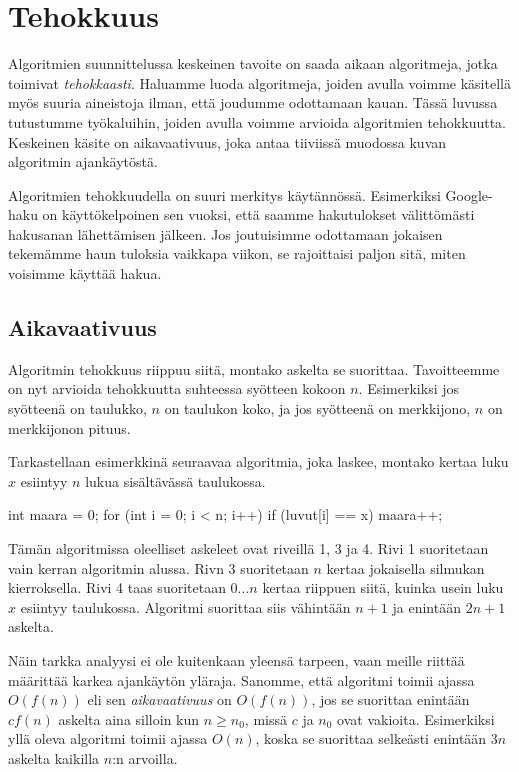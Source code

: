 \chapter{Tehokkuus}

Algoritmien suunnittelussa keskeinen tavoite on saada aikaan
algoritmeja, jotka toimivat \emph{tehokkaasti}.
Haluamme luoda algoritmeja, joiden avulla voimme
käsitellä myös suuria aineistoja ilman, että joudumme
odottamaan kauan.
Tässä luvussa tutustumme työkaluihin, joiden avulla
voimme arvioida algoritmien tehokkuutta.
Keskeinen käsite on aikavaativuus, joka antaa
tiiviissä muodossa kuvan algoritmin ajankäytöstä.

Algoritmien tehokkuudella on suuri merkitys käytännössä.
Esimerkiksi Google-haku on käyttökelpoinen sen vuoksi,
että saamme hakutulokset välittömästi hakusanan lähettämisen
jälkeen.
Jos joutuisimme odottamaan jokaisen tekemämme haun
tuloksia vaikkapa viikon,
se rajoittaisi paljon sitä, miten voisimme käyttää hakua.


\section{Aikavaativuus}

Algoritmin tehokkuus riippuu siitä,
montako askelta se suorittaa.
Tavoitteemme on nyt arvioida tehokkuutta suhteessa
syötteen kokoon $n$.
Esimerkiksi jos syötteenä on taulukko,
$n$ on taulukon koko,
ja jos syötteenä on merkkijono,
$n$ on merkkijonon pituus.

Tarkastellaan esimerkkinä seuraavaa algoritmia,
joka laskee, montako kertaa luku $x$ esiintyy
$n$ lukua sisältävässä taulukossa.

\begin{code}[numbers=left]
int maara = 0;
for (int i = 0; i < n; i++) {
    if (luvut[i] == x) {
        maara++;
    }
}
\end{code}

Tämän algoritmissa oleelliset askeleet ovat riveillä
1, 3 ja 4.
Rivi 1 suoritetaan vain kerran algoritmin alussa.
Rivn 3 suoritetaan $n$ kertaa jokaisella silmukan
kierroksella.
Rivi 4 taas suoritetaan $0 \dots n$
kertaa riippuen siitä, kuinka usein
luku $x$ esiintyy taulukossa.
Algoritmi suorittaa siis vähintään $n+1$ ja enintään $2n+1$
askelta.

Näin tarkka analyysi ei ole kuitenkaan yleensä tarpeen,
vaan meille riittää määrittää karkea ajankäytön yläraja.
Sanomme, että algoritmi toimii ajassa $O(f(n))$ eli sen
\emph{aikavaativuus} on $O(f(n))$, jos se suorittaa
enintään $c f(n)$ askelta aina silloin kun $n \ge n_0$,
missä $c$ ja $n_0$ ovat vakioita.
Esimerkiksi yllä oleva algoritmi toimii ajassa $O(n)$,
koska se suorittaa selkeästi enintään $3n$ askelta
kaikilla $n$:n arvoilla.

